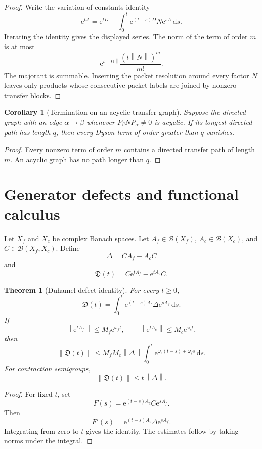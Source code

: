 \documentclass[11pt,letterpaper]{article}
\newtheorem{theorem}{Theorem}[section]
\theoremstyle{plain}
\theoremstyle{plain}
\theoremstyle{plain}
\newtheorem{corollary}[corollary]{Corollary}
\theoremstyle{definition}
\theoremstyle{definition}
\theoremstyle{definition}
\theoremstyle{definition}
\theoremstyle{definition}
\theoremstyle{remark}
\theoremstyle{remark}
\theoremstyle{remark}
\theoremstyle{remark}
\theoremstyle{remark}
\newcommand{\norm}[1]{\left\lVert#1\right\rVert}
\theoremstyle{remark}
\newcommand{\e}{\mathrm e}
\newcommand{\dd}{\,\mathrm d}
\let\KomorebiPrimitiveMathcal\mathcal
\renewcommand{\mathcal}[1]{{\KomorebiPrimitiveMathcal{#1}}}
\let\KomorebiPrimitivemathfrak\mathfrak
\renewcommand{\mathfrak}[1]{{\KomorebiPrimitivemathfrak{#1}}}
\let\KomorebiPrimitivemathrm\mathrm
\renewcommand{\mathrm}[1]{{\KomorebiPrimitivemathrm{#1}}}
\begin{document}
\begin{proof}
Write the variation of constants identity
\[
\e^{tA}
=
\e^{tD}
+
\int_0^t\e^{(t-s)D}N\e^{sA}\dd s.
\]
Iterating the identity gives the displayed series. The norm of the term of order \(m\) is at most
\[
\e^{t\norm D}\frac{(t\norm N)^m}{m!}.
\]
The majorant is summable. Inserting the packet resolution around every factor \(N\) leaves only products whose consecutive packet labels are joined by nonzero transfer blocks.
\end{proof}

\begin{corollary}[Termination on an acyclic transfer graph]\label{extended:record:009}\label{extended:cor:acyclic_termination}
Suppose the directed graph with an edge \(\alpha\to\beta\) whenever \(P_\beta NP_\alpha\neq0\) is acyclic. If its longest directed path has length \(q\), then every Dyson term of order greater than \(q\) vanishes.
\end{corollary}

\begin{proof}
Every nonzero term of order \(m\) contains a directed transfer path of length \(m\). An acyclic graph has no path longer than \(q\).
\end{proof}

\FloatBarrier
\section{Generator defects and functional calculus}\label{extended:section:03}\label{extended:sec:defects}

Let \(X_f\) and \(X_c\) be complex Banach spaces. Let \(A_f\in\mathcal B(X_f)\), \(A_c\in\mathcal B(X_c)\), and \(C\in\mathcal B(X_f,X_c)\). Define
\[
\Delta=CA_f-A_cC
\]
and
\[
\mathfrak D(t)=C\e^{tA_f}-\e^{tA_c}C.
\]

\begin{theorem}[Duhamel defect identity]\label{extended:record:010}\label{extended:thm:duhamel_defect}
For every \(t\geq0\),
\[
\mathfrak D(t)
=
\int_0^t
\e^{(t-s)A_c}\Delta\e^{sA_f}
\dd s.
\]
If
\[
\norm{\e^{tA_f}}\leq M_f\e^{\omega_f t},
\qquad
\norm{\e^{tA_c}}\leq M_c\e^{\omega_c t},
\]
then
\[
\norm{\mathfrak D(t)}
\leq
M_fM_c\norm\Delta
\int_0^t
\e^{\omega_c(t-s)+\omega_fs}
\dd s.
\]
For contraction semigroups,
\[
\norm{\mathfrak D(t)}\leq t\norm\Delta.
\]
\end{theorem}

\begin{proof}
For fixed \(t\), set
\[
F(s)=\e^{(t-s)A_c}C\e^{sA_f}.
\]
Then
\[
F'(s)=\e^{(t-s)A_c}\Delta\e^{sA_f}.
\]
Integrating from zero to \(t\) gives the identity. The estimates follow by taking norms under the integral.
\end{proof}
\end{document}

